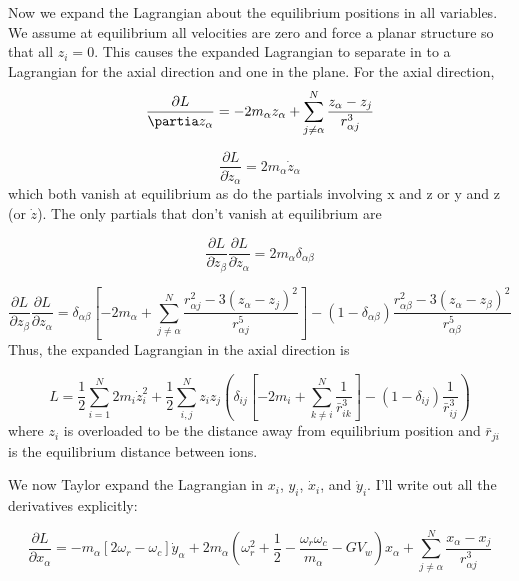 \documentclass[12pt]{article}
\begin{document}
Now we expand the Lagrangian about the equilibrium positions in all variables. We assume at equilibrium all velocities are zero and force a planar structure so that all $z_i = 0$. This causes the expanded Lagrangian to separate in to a Lagrangian for the axial direction and one in the plane.
For the axial direction,
\begin{equation}
\frac{\partial L}{\partia z_{\alpha}} = -2 m_{\alpha}z_{\alpha}+  \sum^N_{j \neq \alpha}\frac{z_{\alpha}-z_j}{r^3_{\alpha j}}
\end{equation}

\begin{equation}
\frac{\partial L}{\partial \dot{z}_{\alpha}} = 2 m_{\alpha}\dot{z}_{\alpha}
\end{equation}
which both vanish at equilibrium as do the partials involving x and z or y and z (or $\dot{z}$). The only partials that don't vanish at equilibrium are

\begin{equation}
\frac{\partial L}{\partial \dot{z}_{\beta}} \frac{\partial L}{\partial \dot{z}_{\alpha}} = 2 m_{\alpha} \delta_{\alpha \beta}
\end{equation}

\begin{equation}
\frac{\partial L}{\partial z_{\beta}}\frac{\partial L}{\partial z_{\alpha}} = \delta_{\alpha \beta} \left[ -2 m_{\alpha}+\sum^N_{j \neq \alpha}\frac{r^2_{\alpha j} -3\left(z_{\alpha}-z_j \right)^2}{r^5_{\alpha j}}\right] - \left(1- \delta_{\alpha \beta} \right) \frac{r^2_{\alpha \beta} -3\left(z_{\alpha}-z_{\beta} \right)^2}{r^5_{\alpha \beta}}
\end{equation}
Thus, the expanded Lagrangian in the axial direction is

\begin{equation}
L = \frac{1}{2}\sum^N_{i=1} 2m_i \dot{z}_i^2 + \frac{1}{2}\sum^N_{i,j} z_i z_j \left( \delta_{i j} \left[ -2 m_{i}+\sum^N_{k \neq i}\frac{1}{\bar{r}^3_{i k}}\right]
-  \left(1- \delta_{i j} \right) \frac{1}{\bar{r}^3_{i j}} \right)
\end{equation}
where $z_i$ is overloaded to be the distance away from equilibrium position and $\bar{r}_{ji}$ is the equilibrium distance between ions.

We now Taylor expand the Lagrangian in $x_i$, $y_i$, $\dot{x}_i$, and $\dot{y}_i$. I'll write out all the derivatives explicitly:

\begin{equation}
\frac{\partial L}{\partial x_{\alpha}} = - m_{\alpha}\left[2\omega_r-\omega_c\right]\dot{y}_{\alpha} + 2m_{\alpha} \left(\omega^2_r +\frac{1}{2} - \frac{\omega_r \omega_c}{m_{\alpha}} - G V_w \right) x_{\alpha} +  \sum^N_{j \neq \alpha}\frac{x_{\alpha}-x_j}{r^3_{\alpha j}}
\end{equation}
\end{document}
